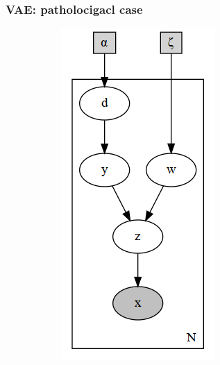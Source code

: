 \documentclass[final]{beamer}
\begin{document}
\begin{frame}
\frametitle{VAE: patholocigacl case}

\begin{figure}[h]
\centering
\begin{subfigure}[b]{0.2\textwidth}
\includegraphics[width=\textwidth]{plots/dirichlet_gmm_p.gv.png}

\end{subfigure}
\end{figure}
\end{frame}
\end{document}
